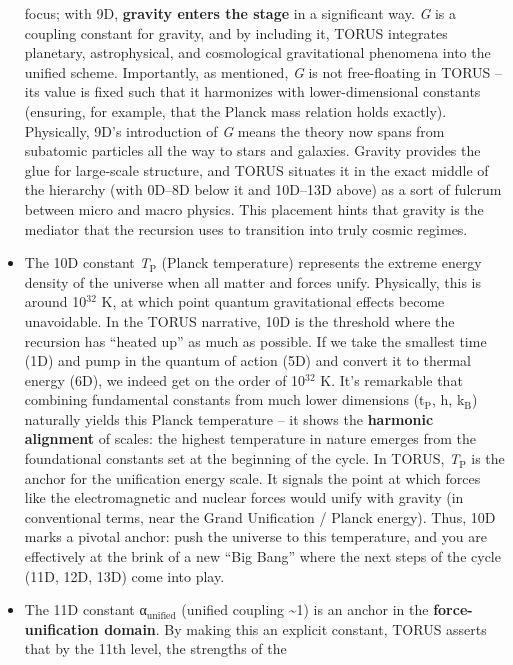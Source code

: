 \documentclass[]{article}
\newcommand{\subscript}[1]{\ensuremath{_{\mathrm{#1}}}}
\newcommand{\superscript}[1]{\ensuremath{^{\mathrm{#1}}}}
\begin{document}
\begin{itemize}
  focus; with 9D, \textbf{gravity enters the stage} in a significant
  way. \emph{G} is a coupling constant for gravity, and by including it,
  TORUS integrates planetary, astrophysical, and cosmological
  gravitational phenomena into the unified scheme. Importantly, as
  mentioned, \emph{G} is not free-floating in TORUS -- its value is
  fixed such that it harmonizes with lower-dimensional constants
  (ensuring, for example, that the Planck mass relation holds exactly)​.
  Physically, 9D's introduction of \emph{G} means the theory now spans
  from subatomic particles all the way to stars and galaxies. Gravity
  provides the glue for large-scale structure, and TORUS situates it in
  the exact middle of the hierarchy (with 0D--8D below it and 10D--13D
  above) as a sort of fulcrum between micro and macro physics. This
  placement hints that gravity is the mediator that the recursion uses
  to transition into truly cosmic regimes.
\item
  The 10D constant
  \emph{T\subscript{P}}
  (Planck temperature) represents the extreme energy density of the
  universe when all matter and forces unify. Physically, this is around
  10\superscript{32} K, at which point quantum gravitational effects become
  unavoidable. In the TORUS narrative, 10D is the threshold where the
  recursion has ``heated up'' as much as possible​. If we take the
  smallest time (1D) and pump in the quantum of action (5D) and convert
  it to thermal energy (6D), we indeed get on the order of 10\superscript{32} K​.
  It's remarkable that combining fundamental constants from much lower
  dimensions
  (t\subscript{P}, h,
  k\subscript{B}) naturally
  yields this Planck temperature -- it shows the \textbf{harmonic
  alignment} of scales: the highest temperature in nature emerges from
  the foundational constants set at the beginning of the
  cycle​. In TORUS,
  \emph{T\subscript{P}} is
  the anchor for the unification energy scale. It signals the point at
  which forces like the electromagnetic and nuclear forces would unify
  with gravity (in conventional terms, near the Grand Unification /
  Planck energy). Thus, 10D marks a pivotal anchor: push the universe to
  this temperature, and you are effectively at the brink of a new ``Big
  Bang'' where the next steps of the cycle (11D, 12D, 13D) come into
  play.
\item
  The 11D constant
  α\subscript{unified}
  (unified coupling \textasciitilde{}1) is an anchor in the
  \textbf{force-unification domain}. By making this an explicit
  constant, TORUS asserts that by the 11th level, the strengths of the

\end{itemize}
\end{document}
